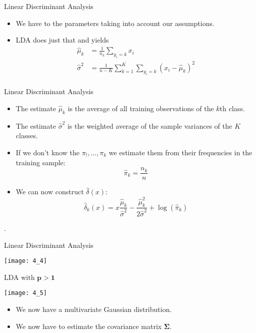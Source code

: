 \documentclass[mathserif, aspectratio=169]{beamer}
\begin{document}
\begin{frame}{Linear Discriminant Analysis}
	\begin{itemize}
		\item We have to  the parameters taking into account 
			our assumptions.
		\item LDA does just that and yields
			\begin{align*}
				\hat{\mu}_k &= \frac{1}{n_k}\sum_{y_i = k} x_i\\
				\hat{\sigma}^2 &= \frac{1}{n - K}
				\sum_{k=1}^{K}\sum_{y_i = k} (x_i - \hat{\mu}_k)^2\\
			\end{align*}
	\end{itemize}
\end{frame}

\begin{frame}{Linear Discriminant Analysis}
	\begin{itemize}
		\item The estimate $\hat{\mu}_k$ is the average of all training observations
			of the $k$th class.
		\item The estimate $\hat{\sigma}^2$ is the weighted average of the sample
			variances of the $K$ classes.
		\item If we don't know the $\pi_!, \dots, \pi_k$ we estimate them from their
			frequencies in the training sample:
			\[ \hat{\pi}_k = \frac{n_k}{n} \]
		\item We can now construct $\hat{\delta}(x)$:
			\[
				\hat{\delta}_k(x) =
				x \frac{\hat{\mu}_k}{\hat{\sigma}^2} 
				- \frac{\hat{\mu}_k^2}{2\hat{\sigma}^2}
				+ \log\left(\hat{\pi}_k\right)
			\]
	\end{itemize}
	.
\end{frame}

\begin{frame}{Linear Discriminant Analysis}
	\begin{center}
		\texttt{[image: 4\_4]}
	\end{center}
\end{frame}

\begin{frame}{LDA with $\bm{p > 1}$}
	\vspace{-10mm}
	\begin{center}
		\texttt{[image: 4\_5]}
	\end{center}
	\vspace{-5mm}
	\begin{itemize}
		\item We now have a multivariate Gaussian distribution.
		\item We now have to estimate the covariance matrix $\bm{\Sigma}$.
	\end{itemize}
\end{frame}
\end{document}
